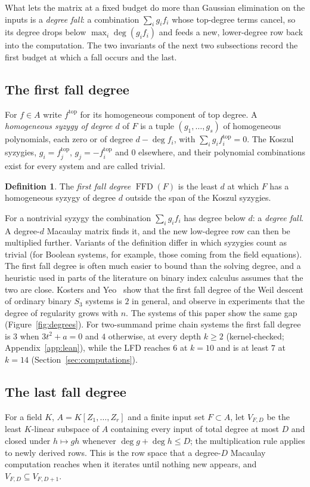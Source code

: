 \documentclass[11pt]{article}
\theoremstyle{definition}\newtheorem{definition}[theorem]{Definition}
\theoremstyle{remark}\newtheorem{remark}[theorem]{Remark}
\newcommand{\ffd}{\operatorname{FFD}}
\begin{document}
What lets the matrix at a fixed budget do more than Gaussian elimination on
the inputs is a \emph{degree fall}: a combination $\sum_i g_if_i$ whose
top-degree terms cancel, so its degree drops below $\max_i\deg(g_if_i)$ and
feeds a new, lower-degree row back into the computation. The two invariants
of the next two subsections record the first budget at which a fall occurs
and the last.

\subsection{The first fall degree}\label{sec:ffd}
For $f\in A$ write $f^{\mathrm{top}}$ for its homogeneous component of top
degree. A \emph{homogeneous syzygy of degree $d$} of $F$ is a tuple
$(g_1,\ldots,g_s)$ of homogeneous polynomials, each zero or of degree
$d-\deg f_i$, with $\sum_ig_if_i^{\mathrm{top}}=0$. The Koszul syzygies,
$g_i=f_j^{\mathrm{top}}$, $g_j=-f_i^{\mathrm{top}}$ and $0$ elsewhere, and
their polynomial combinations exist for every system and are called
trivial.

\begin{definition}\label{def:ffd}
The \emph{first fall degree} $\ffd(F)$ is the least $d$ at which $F$ has a
homogeneous syzygy of degree $d$ outside the span of the Koszul
syzygies.
\end{definition}

For a nontrivial syzygy the combination $\sum_ig_if_i$ has degree below
$d$: a \emph{degree fall}. A degree-$d$ Macaulay matrix finds it, and the
new low-degree row can then be multiplied further. Variants of the
definition differ in which syzygies count as trivial (for Boolean systems,
for example, those coming from the field equations). The first fall degree
is often much easier to bound than the solving degree, and a heuristic used
in parts of the literature on binary index calculus assumes that the two are
close. Kosters and Yeo~\cite{ky} show that the first fall degree of the Weil
descent of ordinary binary $S_3$ systems is $2$ in general, and observe in
experiments that the degree of regularity grows with $n$. The systems of
this paper show the same gap (Figure~\ref{fig:degrees}). For two-summand
prime chain systems the first fall degree is $3$ when $3t^2+a=0$ and $4$
otherwise, at every depth $k\ge2$ (kernel-checked;
Appendix~\ref{app:lean}), while the LFD reaches $6$ at $k=10$ and is at least $7$ at
$k=14$ (Section~\ref{sec:computations}).

\subsection{The last fall degree}\label{sec:lfd}
For a field $K$, $A=K[Z_1,\ldots,Z_r]$ and a finite input set $F\subset A$,
let $V_{F,D}$ be the least $K$-linear subspace of $A$ containing every input
of total degree at most $D$ and closed under $h\mapsto gh$ whenever
$\deg g+\deg h\le D$; the multiplication rule applies to newly derived rows.
This is the row space that a degree-$D$ Macaulay computation reaches when it
iterates until nothing new appears, and $V_{F,D}\subseteq V_{F,D+1}$.
\end{document}
